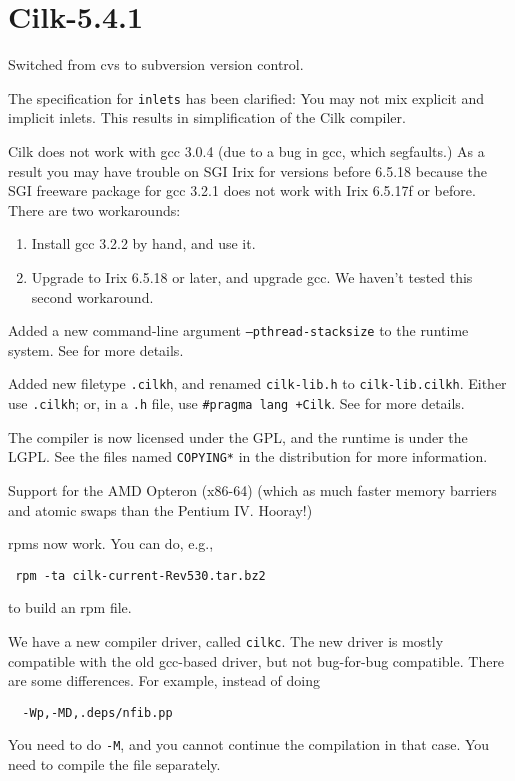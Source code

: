 \section*{Cilk-5.4.1}

\begin{closeitemize}
\item Switched from cvs to subversion version control.
\item The specification for \texttt{inlets} has been clarified: You
may not mix explicit and implicit inlets.  This results in
simplification of the Cilk compiler.
\item Cilk does not work with gcc 3.0.4 (due to a bug in gcc, which
segfaults.)  As a result you may have trouble on SGI Irix for versions
before 6.5.18 because the SGI freeware package for gcc 3.2.1 does not
work with Irix 6.5.17f or before.  There are two workarounds:
\begin{enumerate}
\item Install gcc 3.2.2 by hand, and use it.
\item Upgrade to Irix 6.5.18 or later, and upgrade gcc.  We haven't
tested this second workaround.
\end{enumerate}

\item Added a new command-line argument \texttt{--pthread-stacksize}
to the runtime system.  See  for more details.

\item Added new filetype \texttt{.cilkh}, and renamed
\texttt{cilk-lib.h} to \texttt{cilk-lib.cilkh}.  Either use
\texttt{.cilkh}; or, in a \texttt{.h} file, use
\verb/#pragma lang +Cilk/.  See  for more details.

\item The compiler is now licensed under the GPL, and the runtime is
under the LGPL.  See the files named \texttt{COPYING*} in the
distribution for more information.

\item Support for the AMD Opteron (x86-64) (which as much faster
memory barriers and atomic swaps than the Pentium IV.  Hooray!)

\item rpms now work.  You can do, e.g.,
\begin{verbatim}
 rpm -ta cilk-current-Rev530.tar.bz2
\end{verbatim}
to build an rpm file.

\item We have a new compiler driver, called {\tt cilkc}.  The new
driver is mostly compatible with the old gcc-based driver, but not
bug-for-bug compatible.  There are some differences.  For example, instead of doing
\begin{verbatim}
  -Wp,-MD,.deps/nfib.pp
\end{verbatim}
You need to do \verb+-M+, and you cannot continue the compilation in
that case.  You need to compile the file separately.


\end{closeitemize}
